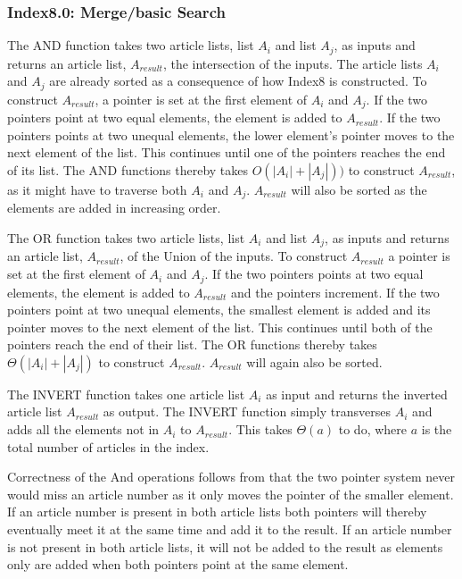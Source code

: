 \subsubsection{Index8.0: Merge/basic Search}
The AND function takes two article lists, list $A_i$ and list $A_j$, as inputs and returns an article list, $A_{result}$, the intersection of the inputs. The article lists $A_i$ and $A_j$ are already sorted as a consequence of how Index8 is constructed. To construct $A_{result}$, a pointer is set at the first element of $A_i$ and $A_j$. If the two pointers point at two equal elements, the element is added to $A_{result}$. If the two pointers points at two unequal elements, the lower element's pointer moves to the next element of the list. This continues until one of the pointers reaches the end of its list. The AND functions thereby takes $O(|A_i| + |A_j|))$ to construct $A_{result}$, as it might have to traverse both $A_i$ and $A_j$. $A_{result}$ will also be sorted as the elements are added in increasing order.

The OR function takes two article lists, list $A_i$ and list $A_j$, as inputs and returns an article list, $A_{result}$, of the Union of the inputs. To construct $A_{result}$ a pointer is set at the first element of $A_i$ and $A_j$. If the two pointers points at two equal elements, the element is added to $A_{result}$ and the pointers increment. If the two pointers point at two unequal elements, the smallest element is added and its pointer moves to the next element of the list. This continues until both of the pointers reach the end of their list. The OR functions thereby takes $\Theta(|A_i| + |A_j|)$ to construct $A_{result}$. $A_{result}$ will again also be sorted.

The INVERT function takes one article list $A_i$ as input and returns the inverted article list $A_{result}$ as output. The INVERT function simply transverses $A_i$ and adds all the elements not in $A_i$ to $A_{result}$.
This takes $\Theta(a)$ to do, where $a$ is the total number of articles in the index. 

Correctness of the And operations follows from that the two pointer system never would miss an article number as it only moves the pointer of the smaller element. If an article number is present in both article lists both pointers will thereby eventually meet it at the same time and add it to the result. If an article number is not present in both article lists, it will not be added to the result as elements only are added when both pointers point at the same element.

